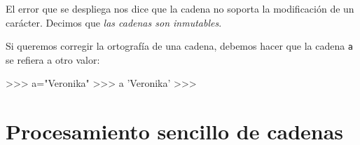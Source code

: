 El error que se despliega nos dice que la cadena no soporta
la modificación de un carácter. Decimos que {\it las cadenas
son inmutables}.

Si queremos corregir la ortografía de una cadena, debemos hacer
que la cadena \lstinline!a! se refiera a otro valor:

\begin{codigo-python-sn}
>>> a="Veronika"
>>> a
'Veronika'
>>>
\end{codigo-python-sn}

\section{Procesamiento sencillo de cadenas}


